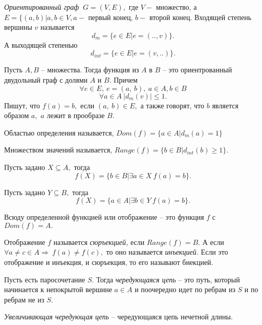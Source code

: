 \begin{definition}
    \textit{Ориентированный граф} $\ G = (V, E),$ где $V -$ множество, а $E = \{ (a, b) | a, b \in V, a  - \text{ первый конец, } b - \text{ второй конец.}$ Входящей степень вершины $v$ называется $$d_{m} = \{ e \in E | e = (..,v) \}.$$ А выходящей степенью $$d_{int} = \{ e \in E | e = (v, ..) \}.$$
\end{definition}

\begin{definition}
    Пусть $A, B$  -- множества. Тогда функция из $A$ в $B$ -- это ориентрованный двудольный граф с долями $A$ и $B.$ Причем $$\forall e \in E, \ e = (a, \ b), \ a \in A, b \in B$$
    $$\forall a \in A \ |d_{m}(v)| \leq 1.$$
    Пишут, что $f(a) = b, $ если $(a, \ b) \in E,$ а также говорят, что $b$ является образом $a,$ $a$ лежит в прообразе $B.$
    
    Областью определения называется, $Dom(f) = \{ a \in A | d_{m}(a) = 1 \}$
    
    Множеством значений называется, $Range(f) = \{ b \in B | d_{int}(b) \geq 1 \}.$

    Пусть задано $X \subseteq A,$ тогда 
    $$f(X) = \{ b \in B | \exists a \in X \ f(a) = b \}.$$

    Пусть задано $Y \subseteq B,$ тогда 
    $$f(X) = \{ a \in A | \exists b \in Y \ f(a) = b \}.$$

\end{definition}

\begin{definition}
    Всюду определенной функцией или отображение -- это функция $f$ с $Dom(f) = A.$
\end{definition}

\begin{definition}
    Отображение $f$ называется \textit{сюръекцией,} если $Range(f) = B.$ А если $\forall a \neq c \in A \Longrightarrow \ f(a) \neq f(c),$ то оно называется \textit{инъекцией.} Если это отображение и инъекция, и сюръекция, то его называют биекцией.
\end{definition}

\begin{definition}
    Пусть есть паросочетание $S.$ Тогда \textit{чередующаяся цепь} -- это путь, который начинается к непокрытой вершине $a \in A$ и поочередно идет по ребрам из $S$ и по ребрам не из $S.$
\end{definition}

\begin{definition}
    \textit{Увеличивающая чередующая цепь} -- чередующаяся цепь нечетной длины.
\end{definition}

